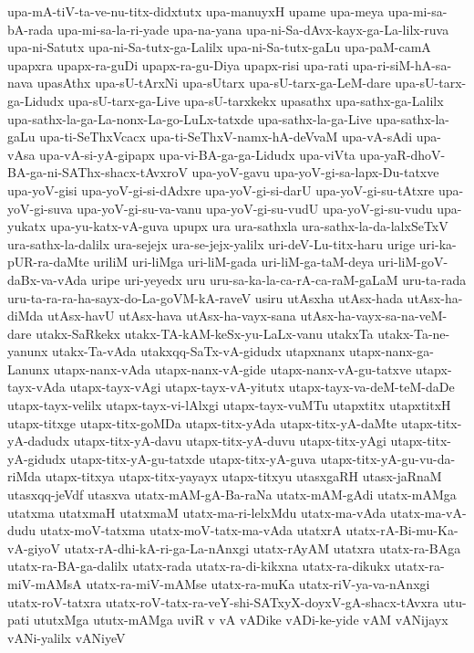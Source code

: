 {upa-mA-tiV-ta-ve-nu-titx-didxtutx
upa-manuyxH
upame
upa-meya
upa-mi-sa-bA-rada
upa-mi-sa-la-ri-yade
upa-na-yana
upa-ni-Sa-dAvx-kayx-ga-La-lilx-ruva
upa-ni-Satutx
upa-ni-Sa-tutx-ga-Lalilx
upa-ni-Sa-tutx-gaLu
upa-paM-camA
upapxra
upapx-ra-guDi
upapx-ra-gu-Diya
upapx-risi
upa-rati
upa-ri-siM-hA-sa-nava
upasAthx
upa-sU-tArxNi
upa-sUtarx
upa-sU-tarx-ga-LeM-dare
upa-sU-tarx-ga-Lidudx
upa-sU-tarx-ga-Live
upa-sU-tarxkekx
upasathx
upa-sathx-ga-Lalilx
upa-sathx-la-ga-La-nonx-La-go-LuLx-tatxde
upa-sathx-la-ga-Live
upa-sathx-la-gaLu
upa-ti-SeThxVcacx
upa-ti-SeThxV-namx-hA-deVvaM
upa-vA-sAdi
upa-vAsa
upa-vA-si-yA-gipapx
upa-vi-BA-ga-ga-Lidudx
upa-viVta
upa-yaR-dhoV-BA-ga-ni-SAThx-shacx-tAvxroV
upa-yoV-gavu
upa-yoV-gi-sa-lapx-Du-tatxve
upa-yoV-gisi
upa-yoV-gi-si-dAdxre
upa-yoV-gi-si-darU
upa-yoV-gi-su-tAtxre
upa-yoV-gi-suva
upa-yoV-gi-su-va-vanu
upa-yoV-gi-su-vudU
upa-yoV-gi-su-vudu
upa-yukatx
upa-yu-katx-vA-guva
upupx
ura
ura-sathxla
ura-sathx-la-da-lalxSeTxV
ura-sathx-la-dalilx
ura-sejejx
ura-se-jejx-yalilx
uri-deV-Lu-titx-haru
urige
uri-ka-pUR-ra-daMte
uriliM
uri-liMga
uri-liM-gada
uri-liM-ga-taM-deya
uri-liM-goV-daBx-va-vAda
uripe
uri-yeyedx
uru
uru-sa-ka-la-ca-rA-ca-raM-gaLaM
uru-ta-rada
uru-ta-ra-ra-ha-sayx-do-La-goVM-kA-raveV
usiru
utAsxha
utAsx-hada
utAsx-ha-diMda
utAsx-havU
utAsx-hava
utAsx-ha-vayx-sana
utAsx-ha-vayx-sa-na-veM-dare
utakx-SaRkekx
utakx-TA-kAM-keSx-yu-LaLx-vanu
utakxTa
utakx-Ta-ne-yanunx
utakx-Ta-vAda
utakxqq-SaTx-vA-gidudx
utapxnanx
utapx-nanx-ga-Lanunx
utapx-nanx-vAda
utapx-nanx-vA-gide
utapx-nanx-vA-gu-tatxve
utapx-tayx-vAda
utapx-tayx-vAgi
utapx-tayx-vA-yitutx
utapx-tayx-va-deM-teM-daDe
utapx-tayx-velilx
utapx-tayx-vi-lAlxgi
utapx-tayx-vuMTu
utapxtitx
utapxtitxH
utapx-titxge
utapx-titx-goMDa
utapx-titx-yAda
utapx-titx-yA-daMte
utapx-titx-yA-dadudx
utapx-titx-yA-davu
utapx-titx-yA-duvu
utapx-titx-yAgi
utapx-titx-yA-gidudx
utapx-titx-yA-gu-tatxde
utapx-titx-yA-guva
utapx-titx-yA-gu-vu-da-riMda
utapx-titxya
utapx-titx-yayayx
utapx-titxyu
utasxgaRH
utasx-jaRnaM
utasxqq-jeVdf
utasxva
utatx-mAM-gA-Ba-raNa
utatx-mAM-gAdi
utatx-mAMga
utatxma
utatxmaH
utatxmaM
utatx-ma-ri-lelxMdu
utatx-ma-vAda
utatx-ma-vA-dudu
utatx-moV-tatxma
utatx-moV-tatx-ma-vAda
utatxrA
utatx-rA-Bi-mu-Ka-vA-giyoV
utatx-rA-dhi-kA-ri-ga-La-nAnxgi
utatx-rAyAM
utatxra
utatx-ra-BAga
utatx-ra-BA-ga-dalilx
utatx-rada
utatx-ra-di-kikxna
utatx-ra-dikukx
utatx-ra-miV-mAMsA
utatx-ra-miV-mAMse
utatx-ra-muKa
utatx-riV-ya-va-nAnxgi
utatx-roV-tatxra
utatx-roV-tatx-ra-veY-shi-SATxyX-doyxV-gA-shacx-tAvxra
utu-pati
ututxMga
ututx-mAMga
uviR
v
vA
vADike
vADi-ke-yide
vAM
vANijayx
vANi-yalilx
vANiyeV
}

